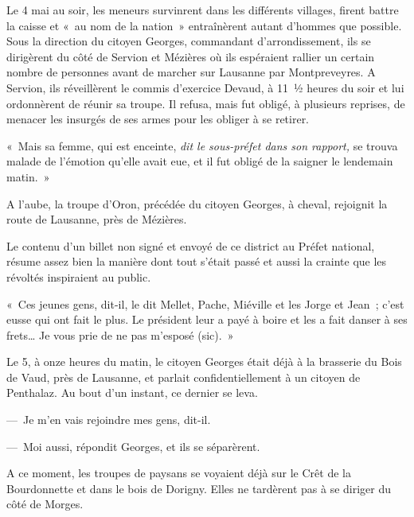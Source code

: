 \documentclass[french,twoside]{book} %
\newcommand\sic{}
\newenvironment{quoteblock}%
  {\begin{quoting}}
  {\end{quoting}}
\newenvironment{quotebar}{%
    \def\FrameCommand{{\color{rubric!10!}\vrule width 0.5em} \hspace{0.9em}}%
    \def\OuterFrameSep{\itemsep} %
    \MakeFramed {\advance\hsize-\width \FrameRestore}
  }%
  {%
    \endMakeFramed
  }
\renewenvironment{quoteblock}%
  {%
    \savenotes
    \setstretch{0.9}
    \normalfont
    \begin{quotebar}
  }
  {%
    \end{quotebar}
    \spewnotes
  }
\begin{document}
Le 4 mai au soir, les meneurs survinrent dans les différents villages, firent battre la caisse et « au nom de la nation » entraînèrent autant d’hommes que possible. Sous la direction du citoyen Georges, commandant d’arrondissement, ils se dirigèrent du côté de Servion et Mézières où ils espéraient rallier un certain nombre de personnes avant de marcher sur Lausanne par Montpreveyres. A Servion, ils réveillèrent le commis d’exercice Devaud, à 11 ½ heures du soir et lui ordonnèrent de réunir sa troupe. Il refusa, mais fut obligé, à plusieurs reprises, de menacer les insurgés de ses armes pour les obliger à se retirer.\par

\begin{quoteblock}
\noindent « Mais sa femme, qui est enceinte, \emph{dit le sous-préfet dans son rapport, }se trouva malade de l’émotion qu’elle avait eue, et il fut obligé de la saigner le lendemain matin. »\end{quoteblock}

\noindent A l’aube, la troupe d’Oron, précédée du citoyen Georges, à cheval, rejoignit la route de Lausanne, près de Mézières.\par
Le contenu d’un billet non signé et envoyé de ce district au Préfet national, résume assez bien la manière dont tout s’était passé et aussi la crainte que les révoltés inspiraient au public.\par

\begin{quoteblock}
\noindent « Ces jeunes gens, dit-il, le dit Mellet, Pache, Miéville et les Jorge et Jean ; c’est eusse qui ont fait le plus. Le président leur a payé à boire et les a fait danser à ses frets… Je vous prie de ne pas m’esposé {{\sic (sic)}}. »\end{quoteblock}

\noindent Le 5, à onze heures du matin, le citoyen Georges était déjà à la brasserie du Bois de Vaud, près de Lausanne, et parlait confidentiellement à un citoyen de Penthalaz. Au bout d’un instant, ce dernier se leva.\par
— Je m’en vais rejoindre mes gens, dit-il.\par
— Moi aussi, répondit Georges, et ils se séparèrent.\par
A ce moment, les troupes de paysans se voyaient déjà sur le Crêt de la Bourdonnette et dans le bois de Dorigny. Elles ne tardèrent pas à se diriger du côté de Morges.
\end{document}
